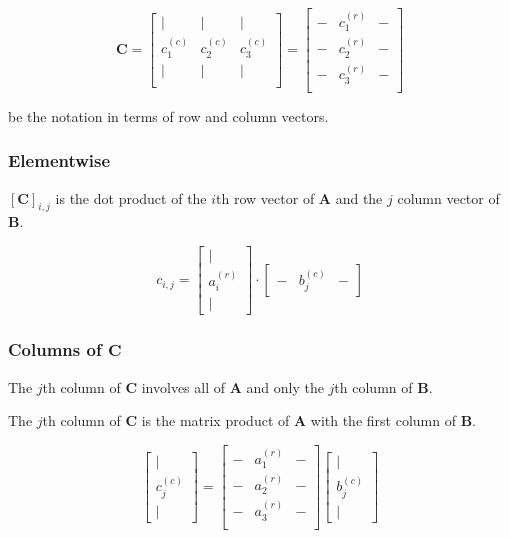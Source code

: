 \begin{equation}
\mathbf{C} = \left[
\begin{array}{ccc}
\vert & \vert & \vert \\
c^{(c)}_1 & c^{(c)}_2 & c^{(c)}_3\\
\vert & \vert & \vert \\
\end{array}
\right] =\left[
\begin{array}{ccc}
- & c^{(r)}_1 & - \\
- & c^{(r)}_2 & - \\
- & c^{(r)}_3 & - \\
\end{array}
\right] 
\end{equation}

be the notation in terms of row and column vectors.

\subsubsection{Elementwise}
$[\mathbf{C}]_{i,j}$ is the dot product of the $i$th row vector of $\mathbf{A}$ and the $j$ column vector of $\mathbf{B}$.

\begin{equation}
c_{i,j} = \left[\begin{array}{c} \vert \\ a_i^{(r)}\\ \vert \end{array}\right] \cdot \left[\begin{array}{ccc} - &b_j^{(c)}& - \end{array}\right]
\end{equation}

\subsubsection{Columns of $\mathbf{C}$}

The $j$th column of $\mathbf{C}$ involves all of $\mathbf{A}$ and only the $j$th column of $\mathbf{B}$.

The $j$th column of $\mathbf{C}$ is the matrix product of $\mathbf{A}$ with the first column of $\mathbf{B}$.

\begin{equation}
\left[
\begin{array}{c}
\vert\\
c^{(c)}_j\\
\vert
\end{array}
\right]=
\left[
\begin{array}{ccc}
- & a^{(r)}_1 & - \\
- & a^{(r)}_2 & - \\
- & a^{(r)}_3 & - \\
\end{array}
\right] 
\left[ \begin{array}{c} \vert \\ b^{(c)}_j  \\ \vert \end{array}\right]
\end{equation}


